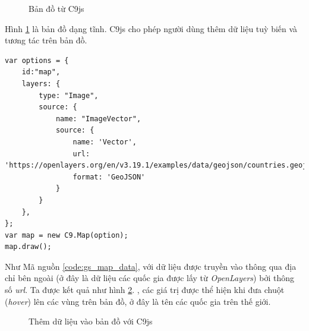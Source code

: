 \documentclass[12pt,a4paper,twoside]{article}
\begin{document}
\begin{figure}[!h]
	\begin{center}
    \caption{Bản đồ từ C9js}
    \label{fig:gs_3}
	\end{center}
\end{figure}

Hình \ref{fig:gs_3} là bản đồ dạng tĩnh. C9js cho phép người dùng thêm dữ liệu tuỳ biến và tương tác trên bản đồ.

\begin{lstlisting}[caption=Thêm dữ liệu vào Bản đồ với C9js, label={code:gs_map_data}]
var options = {  
    id:"map",
    layers: {
        type: "Image",
        source: {
            name: "ImageVector",
            source: {
                name: 'Vector',
                url: 'https://openlayers.org/en/v3.19.1/examples/data/geojson/countries.geojson',
                format: 'GeoJSON'   
            }
        }
    },
};
var map = new C9.Map(option);
map.draw();
\end{lstlisting}

Như Mã nguồn \ref{code:gs_map_data}, với dữ liệu được truyền vào thông qua địa chỉ bên ngoài (ở đây là dữ liệu các quốc gia được lấy từ \textit{OpenLayers}) bởi thông số \textit{url}. Ta được kết quả như hình \ref{fig:gs_4}. , các giá trị được thể hiện khi đưa chuột (\textit{hover}) lên các vùng trên bản đồ, ở đây là tên các quốc gia trên thế giới.

\begin{figure}[!h]
	\begin{center}
    \caption{Thêm dữ liệu vào bản đồ với C9js}
    \label{fig:gs_4}
	\end{center}
\end{figure}
\end{document}
